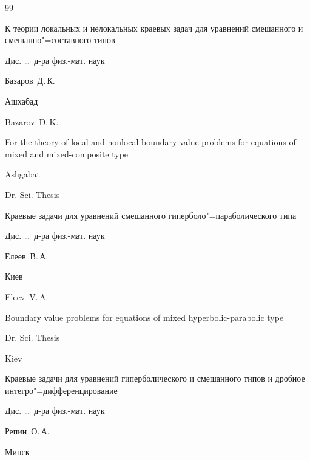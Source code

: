 \begin{thebibliography}{99}

\thesis К теории локальных и нелокальных краевых задач для уравнений смешанного и смешанно"=составного типов

\thesisinfo Дис. \dots\ д-ра физ.-мат. наук

\by Базаров~Д.\,К.

\publaddr Ашхабад



\misctransl

\by Bazarov~D.\,K.

\thesis For the theory of local and nonlocal boundary value problems for equations of mixed and mixed-composite type

\publ Ashgabat

\thesisinfo Dr. Sci. Thesis








\thesis Краевые задачи для уравнений смешанного гиперболо"=параболического типа

\thesisinfo Дис. \dots\ д-ра физ.-мат. наук

\by Елеев~В.\,А.

\publaddr Киев



\misctransl 

\by Eleev~V.\,A.

\thesis Boundary value problems for equations of mixed hyperbolic-parabolic type

\thesisinfo Dr. Sci. Thesis

\publaddr Kiev






\thesis Краевые задачи для уравнений гиперболического и смешанного типов и дробное интегро"=дифференцирование

\thesisinfo Дис. \dots\ д-ра физ.-мат. наук

\by Репин~О.\,А.

\publaddr Минск




\end{thebibliography}
